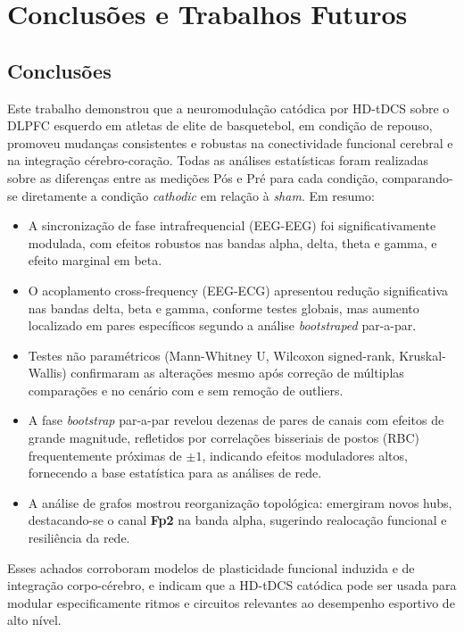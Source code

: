 \chapter{Conclusões e Trabalhos Futuros}
\label{chap:conclusoes_e_trabalhos_futuros}

\section{Conclusões}
Este trabalho demonstrou que a neuromodulação catódica por HD-tDCS sobre o DLPFC esquerdo em atletas de elite de basquetebol, em condição de repouso, promoveu mudanças consistentes e robustas na conectividade funcional cerebral e na integração cérebro-coração. Todas as análises estatísticas foram realizadas sobre as diferenças entre as medições Pós e Pré para cada condição, comparando-se diretamente a condição \emph{cathodic} em relação à \emph{sham}. Em resumo:
\begin{itemize}
  \item A sincronização de fase intrafrequencial (EEG-EEG) foi significativamente modulada, com efeitos robustos nas bandas alpha, delta, theta e gamma, e efeito marginal em beta.
  \item O acoplamento cross-frequency (EEG-ECG) apresentou redução significativa nas bandas delta, beta e gamma, conforme testes globais, mas aumento localizado em pares específicos segundo a análise \textit{bootstraped} par-a-par.
  \item Testes não paramétricos (Mann-Whitney U, Wilcoxon signed-rank, Kruskal-Wallis) confirmaram as alterações mesmo após correção de múltiplas comparações e no cenário com e sem remoção de outliers.
  \item A fase \emph{bootstrap} par-a-par revelou dezenas de pares de canais com efeitos de grande magnitude, refletidos por correlações bisseriais de postos (RBC) frequentemente próximas de $\pm1$, indicando efeitos moduladores altos, fornecendo a base estatística para as análises de rede.
  \item A análise de grafos mostrou reorganização topológica: emergiram novos hubs, destacando-se o canal \textbf{Fp2} na banda alpha, sugerindo realocação funcional e resiliência da rede.
\end{itemize}
  
Esses achados corroboram modelos de plasticidade funcional induzida e de integração corpo-cérebro, e indicam que a HD-tDCS catódica pode ser usada para modular especificamente ritmos e circuitos relevantes ao desempenho esportivo de alto nível.

